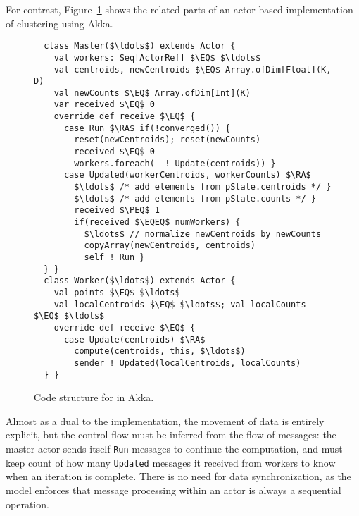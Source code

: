 For contrast, Figure~\ref{fig:kmeansakka} shows the related parts of an
actor-based implementation of \kmeans clustering using Akka.
\begin{figure}
\begin{lstlisting}
  class Master($\ldots$) extends Actor {
    val workers: Seq[ActorRef] $\EQ$ $\ldots$
    val centroids, newCentroids $\EQ$ Array.ofDim[Float](K, D)
    val newCounts $\EQ$ Array.ofDim[Int](K)
    var received $\EQ$ 0
    override def receive $\EQ$ {
      case Run $\RA$ if(!converged()) {
        reset(newCentroids); reset(newCounts)
        received $\EQ$ 0
        workers.foreach(_ ! Update(centroids)) }
      case Updated(workerCentroids, workerCounts) $\RA$
        $\ldots$ /* add elements from pState.centroids */ }
        $\ldots$ /* add elements from pState.counts */ }
        received $\PEQ$ 1
        if(received $\EQEQ$ numWorkers) {
          $\ldots$ // normalize newCentroids by newCounts
          copyArray(newCentroids, centroids)
          self ! Run }
  } }
  class Worker($\ldots$) extends Actor {
    val points $\EQ$ $\ldots$
    val localCentroids $\EQ$ $\ldots$; val localCounts $\EQ$ $\ldots$
    override def receive $\EQ$ {
      case Update(centroids) $\RA$
        compute(centroids, this, $\ldots$)
        sender ! Updated(localCentroids, localCounts)
  } }
\end{lstlisting}
\caption{Code structure for \kmeans in Akka.\label{fig:kmeansakka}}
\end{figure}
Almost as a dual to the \apgas implementation, the movement of data is entirely
explicit, but the control flow must be inferred from the flow of messages: the
master actor sends itself \lstinline{Run} messages to continue the computation,
and must keep count of how many \lstinline{Updated} messages it received from
workers to know when an iteration is complete. There is no need for data
synchronization, as the model enforces that message processing within an actor
is always a sequential operation.
